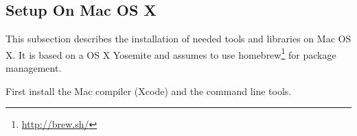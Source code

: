 \documentclass[a4paper,fontsize=10pt,twoside,DIV15,BCOR12mm,headinclude=true,footinclude=false,pagesize,bibtotoc]{scrbook}
\newcommand{\code}[1]{{\texttt{#1}}}
\begin{document}
%
%
%
%
%
%
%
%
%
%

\subsection{Setup On Mac OS X}

This subsection describes the installation of needed tools and libraries
on Mac OS X. It is based on a OS X Yosemite and assumes to use
homebrew\footnote{\url{http://brew.sh/}} for package management.

First install the Mac compiler (Xcode) and the command line tools.
\end{document}

